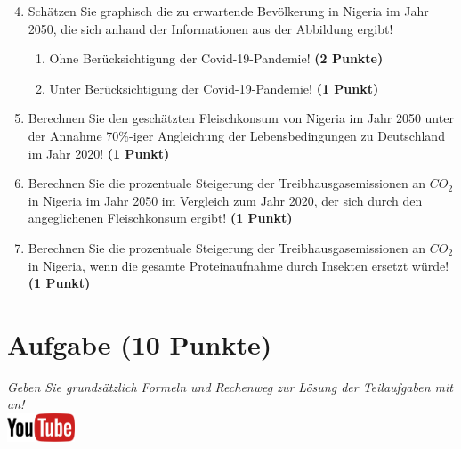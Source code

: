\documentclass[a4paper, 10pt]{scrartcl}\usepackage[]{graphicx}\usepackage[]{xcolor}
\begin{document}
\begin{enumerate}
  \setcounter{enumi}{3}  
\item Sch{\"a}tzen Sie graphisch die zu erwartende Bev{\"o}lkerung in Nigeria im Jahr 2050, die sich
  anhand der Informationen aus der Abbildung ergibt!
\begin{enumerate}
\item Ohne Ber{\"u}cksichtigung der Covid-19-Pandemie! \textbf{(2
    Punkte)}
\item Unter Ber{\"u}cksichtigung der Covid-19-Pandemie! \textbf{(1
    Punkt)}
\end{enumerate}
\item Berechnen Sie den gesch{\"a}tzten Fleischkonsum von Nigeria im Jahr
  2050 unter der Annahme 70\%-iger Angleichung der Lebensbedingungen zu
  Deutschland im Jahr 2020! \textbf{(1 Punkt)}
\item Berechnen Sie die prozentuale Steigerung der Treibhausgasemissionen
  an $CO_2$ in Nigeria im Jahr 2050 im Vergleich zum Jahr 2020, der sich durch den
  angeglichenen Fleischkonsum ergibt! \textbf{(1
    Punkt)}
\item Berechnen Sie die prozentuale Steigerung der Treibhausgasemissionen
  an $CO_2$ in Nigeria, wenn die gesamte Proteinaufnahme 
  durch Insekten ersetzt w{\"u}rde! \textbf{(1
    Punkt)}
\end{enumerate}







 
\clearpage

\section{Aufgabe \hfill (10 Punkte)}

\textit{Geben Sie grunds{\"a}tzlich Formeln und Rechenweg zur L{\"o}sung der
  Teilaufgaben mit an!} \\[1Ex]

\hfill\href{https://youtu.be/8Pb2sKUIMyk}{\includegraphics[width =
  2cm]{img/youtube}} %
\hspace{2Ex}
\end{document}
